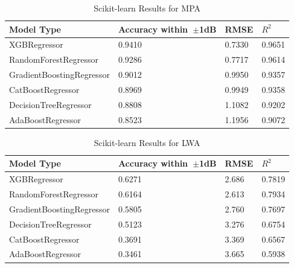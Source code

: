 \documentclass[conference]{IEEEtran}
\begin{document}
\begin{table}[h]
    \caption{Scikit-learn Results for MPA}
    \begin{center}
    \begin{tabular}{ |l|l|l|l| }
        \hline
        Model Type & Accuracy within~$\pm$1dB & RMSE & $R^2$ \\ 
        \hline
        XGBRegressor & 0.9410 & 0.7330 & 0.9651 \\  
        \hline
        RandomForestRegressor & 0.9286 & 0.7717 & 0.9614 \\
        \hline  
        GradientBoostingRegressor & 0.9012 & 0.9950 & 0.9357 \\
        \hline
        CatBoostRegressor & 0.8969 & 0.9949 & 0.9358 \\    
        \hline
        DecisionTreeRegressor & 0.8808 & 1.1082 & 0.9202 \\  
        \hline
        AdaBoostRegressor & 0.8523 & 1.1956 & 0.9072 \\  
        \hline
    \end{tabular}
    \end{center}
    \label{comparing_sklearn_p}
    \end{table}
    
    \begin{table}[h]
    \caption{Scikit-learn Results for LWA}
    \begin{center}
    \begin{tabular}{ |l|l|l|l| }
        \hline
        Model Type & Accuracy within~$\pm$1dB & RMSE & $R^2$ \\ 
        \hline
        XGBRegressor & 0.6271 & 2.686 & 0.7819 \\  
        \hline
        RandomForestRegressor & 0.6164 & 2.613 & 0.7934 \\
        \hline  
        GradientBoostingRegressor & 0.5805 & 2.760 & 0.7697 \\
        \hline
        DecisionTreeRegressor & 0.5123 & 3.276 & 0.6754 \\  
        \hline
        CatBoostRegressor & 0.3691 & 3.369 & 0.6567 \\    
        \hline
        AdaBoostRegressor & 0.3461 & 3.665 & 0.5938 \\  
        \hline
    \end{tabular}
    \end{center}
    \label{comparing_sklearn_lw}
    \end{table}
\end{document}
